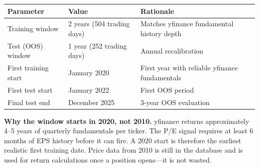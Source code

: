 \documentclass[11pt, oneside]{book}
\begin{document}
\begin{center}
\begin{tabular}{lll}
\toprule
\textbf{Parameter} & \textbf{Value} & \textbf{Rationale} \\
\midrule
Training window  & 2 years (504 trading days) & Matches yfinance fundamental history depth \\
Test (OOS) window & 1 year (252 trading days) & Annual recalibration \\
First training start & January 2020 & First year with reliable yfinance fundamentals \\
First test start & January 2022 & First OOS period \\
Final test end & December 2025 & 3-year OOS evaluation \\
\bottomrule
\end{tabular}
\end{center}

\begin{warningbox}
\textbf{Why the window starts in 2020, not 2010.} yfinance returns approximately 4--5 years of quarterly fundamentals per ticker. The P/E signal requires at least 6 months of EPS history before it can fire. A 2020 start is therefore the earliest realistic first training date. Price data from 2010 is still in the database and is used for return calculations once a position opens---it is not wasted.
\end{warningbox}
\end{document}

